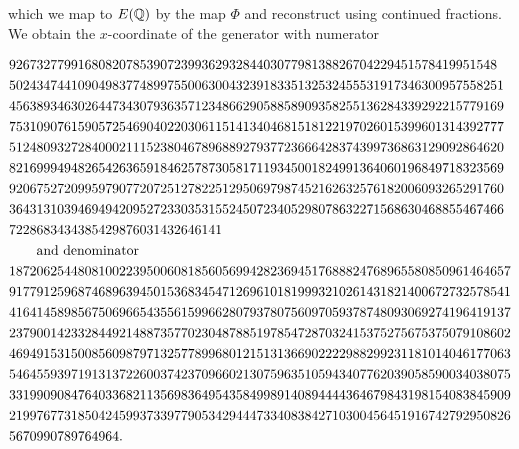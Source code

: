 which we map to $E(\mathbb{Q})$ by the map $\Phi$ and reconstruct using continued fractions. We obtain the $x$-coordinate of the generator with numerator
\begin{small}
\begin{align*}
&92673277991680820785390723993629328440307798138826704229451578419951548\\ &502434744109049837748997550063004323918335132532455531917346300957558251\\ &456389346302644734307936357123486629058858909358255136284339292215779169\\ &753109076159057254690402203061151413404681518122197026015399601314392777\\ &512480932728400021115238046789688927937723666428374399736863129092864620\\ &821699949482654263659184625787305817119345001824991364060196849718323569\\ &920675272099597907720725127822512950697987452162632576182006093265291760\\ &364313103946949420952723303531552450723405298078632271568630468855467466\\ &7228683434385429876031432646141\\
&\;\;\;\;\;\;\text{\begin{normalsize} and denominator\end{normalsize}}\\
&1872062544808100223950060818560569942823694517688824768965580850961464657\\ &9177912596874689639450153683454712696101819993210261431821400672732578541\\ &4164145898567506966543556159966280793780756097059378748093069274196419137\\ &2379001423328449214887357702304878851978547287032415375275675375079108602\\ &4694915315008560987971325778996801215131366902222988299231181014046177063\\ &5464559397191313722600374237096602130759635105943407762039058590034038075\\ &3319909084764033682113569836495435849989140894444364679843198154083845909\\ &2199767731850424599373397790534294447334083842710300456451916742792950826\\
&5670990789764964.
\end{align*}
\end{small}



